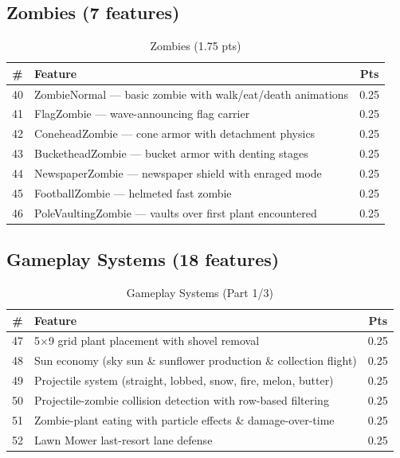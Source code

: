 \documentclass[12pt,a4paper]{article}
\begin{document}
\subsection{Zombies (7 features)}
\begin{table}[htbp]
\centering
\footnotesize
\begin{tabular}{clc}
\toprule
\textbf{\#} & \textbf{Feature} & \textbf{Pts} \\
\midrule
40 & ZombieNormal --- basic zombie with walk/eat/death animations & 0.25 \\
41 & FlagZombie --- wave-announcing flag carrier & 0.25 \\
42 & ConeheadZombie --- cone armor with detachment physics & 0.25 \\
43 & BucketheadZombie --- bucket armor with denting stages & 0.25 \\
44 & NewspaperZombie --- newspaper shield with enraged mode & 0.25 \\
45 & FootballZombie --- helmeted fast zombie & 0.25 \\
46 & PoleVaultingZombie --- vaults over first plant encountered & 0.25 \\
\bottomrule
\end{tabular}
\caption{Zombies (1.75 pts)}
\end{table}

\clearpage
\subsection{Gameplay Systems (18 features)}
\begin{table}[htbp]
\centering
\tiny
\begin{tabular}{clc}
\toprule
\textbf{\#} & \textbf{Feature} & \textbf{Pts} \\
\midrule
47 & 5$\times$9 grid plant placement with shovel removal & 0.25 \\
48 & Sun economy (sky sun \& sunflower production \& collection flight) & 0.25 \\
49 & Projectile system (straight, lobbed, snow, fire, melon, butter) & 0.25 \\
50 & Projectile-zombie collision detection with row-based filtering & 0.25 \\
51 & Zombie-plant eating with particle effects \& damage-over-time & 0.25 \\
52 & Lawn Mower last-resort lane defense & 0.25 \\
\bottomrule
\end{tabular}
\caption{Gameplay Systems (Part 1/3)}
\end{table}
\end{document}
